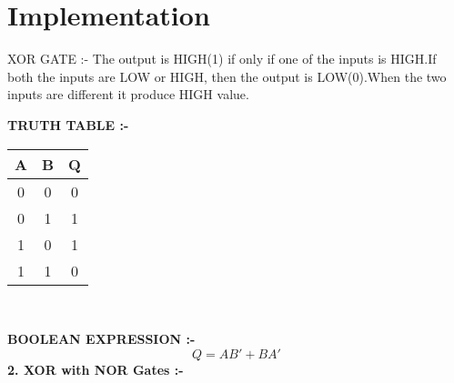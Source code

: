 \documentclass[10pt, a4paper]{article}
\begin{document}
   \section{Implementation}

{XOR GATE :-}
The output is HIGH(1) if only if one of the inputs is HIGH.If both the inputs are LOW or HIGH, then the output is LOW(0).When the two inputs are different it produce HIGH value.
\vspace{5MM}

\textbf{TRUTH TABLE :-}
\vspace{5MM}
\newline

\begin{tabular}{|c|c|c|}
\hline
\textbf{A} & {B} & {Q} \\
\hline
0 & 0 & 0 \\
\hline
0 & 1 & 1 \\
\hline
1 & 0 & 1 \\
\hline
1 & 1 & 0 \\
\hline


\end{tabular}
\vspace{3mm}
\\
\vspace{5MM}
\newline

\textbf{BOOLEAN EXPRESSION :-}
\vspace{5MM}
\newline
\begin{equation}
    Q = AB' + BA'
\end{equation}
\textbf{2. XOR with NOR Gates :-}
\end{document}
